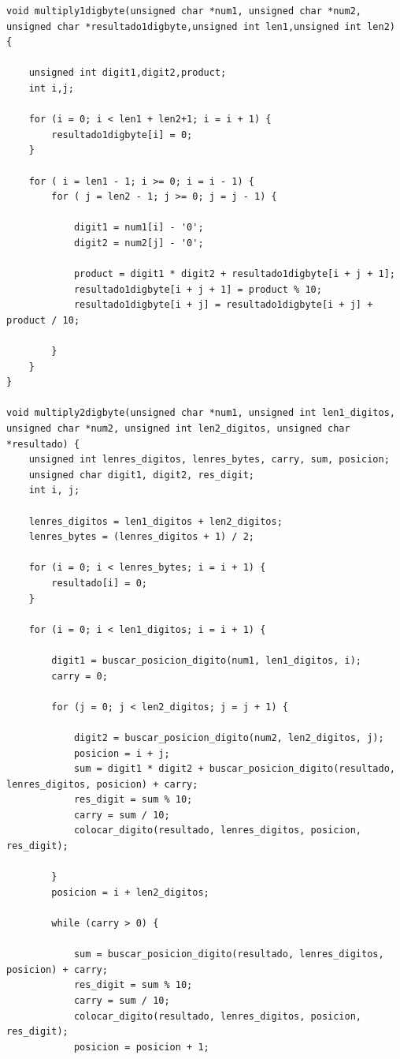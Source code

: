 \documentclass[10pt]{article}
\begin{document}
\begin{lstlisting}
void multiply1digbyte(unsigned char *num1, unsigned char *num2, unsigned char *resultado1digbyte,unsigned int len1,unsigned int len2) {

    unsigned int digit1,digit2,product;
    int i,j;

    for (i = 0; i < len1 + len2+1; i = i + 1) {
        resultado1digbyte[i] = 0;
    }

    for ( i = len1 - 1; i >= 0; i = i - 1) {
        for ( j = len2 - 1; j >= 0; j = j - 1) {

            digit1 = num1[i] - '0'; 
            digit2 = num2[j] - '0'; 

            product = digit1 * digit2 + resultado1digbyte[i + j + 1]; 
            resultado1digbyte[i + j + 1] = product % 10; 
            resultado1digbyte[i + j] = resultado1digbyte[i + j] + product / 10;

        }
    }
}

void multiply2digbyte(unsigned char *num1, unsigned int len1_digitos, unsigned char *num2, unsigned int len2_digitos, unsigned char *resultado) {
    unsigned int lenres_digitos, lenres_bytes, carry, sum, posicion;
    unsigned char digit1, digit2, res_digit;
    int i, j;

    lenres_digitos = len1_digitos + len2_digitos;
    lenres_bytes = (lenres_digitos + 1) / 2;

    for (i = 0; i < lenres_bytes; i = i + 1) {
        resultado[i] = 0;
    }

    for (i = 0; i < len1_digitos; i = i + 1) {

        digit1 = buscar_posicion_digito(num1, len1_digitos, i);
        carry = 0;

        for (j = 0; j < len2_digitos; j = j + 1) {

            digit2 = buscar_posicion_digito(num2, len2_digitos, j);
            posicion = i + j;
            sum = digit1 * digit2 + buscar_posicion_digito(resultado, lenres_digitos, posicion) + carry;
            res_digit = sum % 10;
            carry = sum / 10;
            colocar_digito(resultado, lenres_digitos, posicion, res_digit);

        }
        posicion = i + len2_digitos;

        while (carry > 0) {

            sum = buscar_posicion_digito(resultado, lenres_digitos, posicion) + carry;
            res_digit = sum % 10;
            carry = sum / 10;
            colocar_digito(resultado, lenres_digitos, posicion, res_digit);
            posicion = posicion + 1;


\end{lstlisting}
\end{document}
